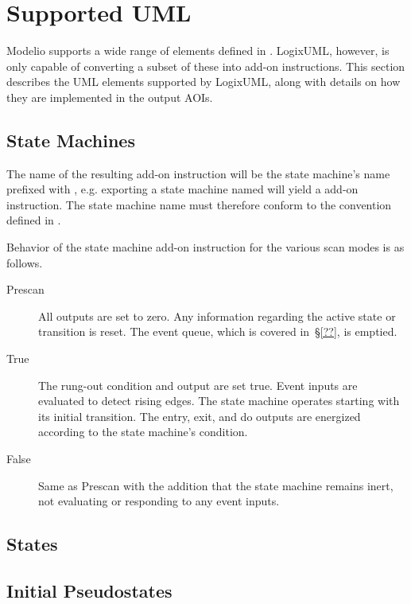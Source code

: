 \section{Supported UML}

Modelio supports a wide range of elements defined in \textcite{OMGUML}.
LogixUML, however, is only capable of converting a subset of these into
add-on instructions. This section describes the UML elements supported
by LogixUML, along with details on how they are implemented in the output
AOIs.

\subsection{State Machines}

The name of the resulting add-on instruction will be the state machine's
name prefixed with , e.g. exporting a state
machine named  will yield a
 add-on instruction.
The state machine name must therefore conform to the convention defined
in \textcite[Chapter~2]{AOI}.

Behavior of the state machine add-on instruction for the various scan
modes is as follows.

\begin{description}
  \item[Prescan] All outputs are set to zero. Any information regarding
    the active state or transition is reset. The event queue, which is
    covered in~\S\ref{??}, is emptied.

  \item[True] The rung-out condition and  output are set
    true. Event inputs are evaluated to detect rising edges. The state machine
    operates starting with its initial transition. The entry, exit, and
    do outputs are energized according to the state machine's condition.

  \item[False] Same as Prescan with the addition that the state machine
    remains inert, not evaluating or responding to any event inputs.
\end{description}


\subsection{States}
\label{ss:states}


\subsection{Initial Pseudostates}

